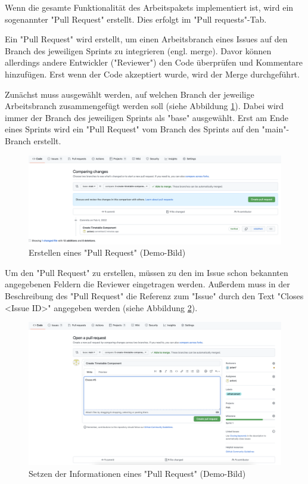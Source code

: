 
Wenn die gesamte Funktionalität des Arbeitspakets implementiert ist, wird ein sogenannter "Pull Request" erstellt. Dies erfolgt im "Pull requests"-Tab. 

Ein "Pull Request" wird erstellt, um einen Arbeits\-branch eines Issues auf den Branch des jeweiligen Sprints zu integrieren (engl. merge). Davor können allerdings andere Entwickler ("Reviewer") den Code überprüfen und Kommentare hinzufügen. Erst wenn der Code akzeptiert wurde, wird der Merge durchgeführt.

Zunächst muss ausgewählt werden, auf welchen Branch der jeweilige Arbeits\-branch zusammengefügt werden soll (siehe Abbildung \ref{fig:createPullRequest}). 
Dabei wird immer der Branch des jeweiligen Sprints als "base" ausgewählt. 
Erst am Ende eines Sprints wird ein "Pull Request" vom Branch des Sprints auf den "main"-Branch erstellt.

\begin{figure}[H]
    \centering
    \includegraphics[width=\textwidth]{media/ProjectManagement/CreatePull.png}
    \caption{Erstellen eines "Pull Request" (Demo-Bild)}
    \label{fig:createPullRequest}
\end{figure}

Um den "Pull Request" zu erstellen, müssen zu den im Issue schon bekannten angegebenen Feldern die Reviewer eingetragen werden. 
Außerdem muss in der Beschreibung des "Pull Request" die Referenz zum "Issue" durch den Text "Closes \textless Issue ID\textgreater" angegeben werden (siehe Abbildung \ref{fig:EnterPullRequestInfo}).

\begin{figure}[H]
    \centering
    \includegraphics[width=\textwidth]{media/ProjectManagement/EnterPullInfo.png}
    \caption{Setzen der Informationen eines "Pull Request" (Demo-Bild)}
    \label{fig:EnterPullRequestInfo}
\end{figure}

